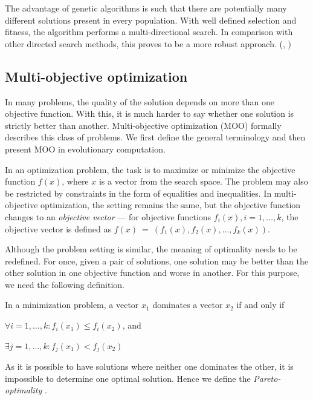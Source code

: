 The advantage of genetic algorithms is such that there are potentially 
many different solutions present in every population. With well defined 
selection and fitness, the algorithm performs a multi-directional search. 
In comparison with other directed search methods, this proves to be a more 
robust approach. (\cite{Michalewicz:1996:GAD:229930}, 
\cite{Mitchell:1997:ML:541177}) %

\subsection{Multi-objective optimization} \label{moo}
In many problems, the quality of the solution depends on more than one
objective function. With this, it is much harder to say whether one solution
is strictly better than another. Multi-objective optimization (MOO) formally
describes this class of problems. We first define the general terminology
and then present MOO in evolutionary computation.

In an optimization problem, the task is to maximize or minimize the objective
function $f(x)$, where $x$ is a vector from the search space. The problem may
also be restricted by constraints in the form of equalities and inequalities.
In multi-objective optimization, the setting remains the same, but the
objective function changes to an \emph{objective vector} ---
for objective functions $f_i(x), i = 1,\ldots,k$, the objective vector is 
defined as $f(x)~=~(f_1(x), f_2(x), \ldots, f_k(x))$.

Although the problem setting is similar, the meaning of optimality needs to 
be redefined. For once, given a pair of solutions, one solution may be better 
than the other solution in one objective function and worse in another. For 
this purpose, we need the following definition.

\begin{definition}[Domination]
In a minimization problem, a vector $x_1$ dominates a vector $x_2$ if and 
only if 
\begin{compactitem}
\item $\forall i=1,\ldots,k: f_i(x_1) \leq f_i(x_2)$, and
\item $\exists j=1,\ldots,k: f_j(x_1) < f_j(x_2)$
\end{compactitem}
\end{definition}

As it is possible to have solutions where neither one dominates the other,
it is impossible to determine one optimal solution. Hence we define the 
\emph{Pareto-optimality}
\citep[p.~551-561,~569--573]{Engelbrecht:2007:CII:1557464}.

